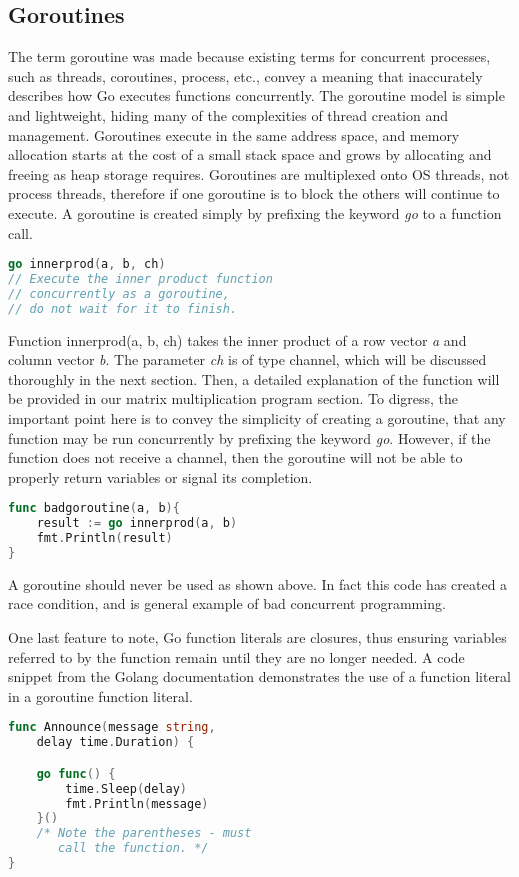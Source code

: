 \subsection{Goroutines}
The term goroutine was made because existing terms for concurrent processes, such as threads, coroutines, process, etc., convey a meaning that inaccurately describes how Go executes functions concurrently. The goroutine model is simple and lightweight, hiding many of the complexities of thread creation and management. Goroutines execute in the same address space, and memory allocation starts at the cost of a small stack space and grows by allocating and freeing as heap storage requires. Goroutines are multiplexed onto OS threads, not process threads, therefore if one goroutine is to block the others will continue to execute.\cite{website:go-lang-documentation}
	A goroutine is created simply by prefixing the keyword \emph{go} to a function call.	
\begin{lstlisting}[language=Go]
go innerprod(a, b, ch) 
// Execute the inner product function
// concurrently as a goroutine,
// do not wait for it to finish.
\end{lstlisting}
Function innerprod(a, b, ch) takes the inner product of a row vector \emph{a} and column vector \emph{b}. The parameter \emph{ch} is of type channel, which will be discussed thoroughly in the next section. Then, a detailed explanation of the function will be provided in our matrix multiplication program section. To digress, the important point here is to convey the simplicity of creating a goroutine, that any function may be run concurrently by prefixing the keyword \emph{go}. However, if the function does not receive a channel, then the goroutine will not be able to properly return variables or signal its completion.
\begin{lstlisting}[language=Go]
func badgoroutine(a, b){
	result := go innerprod(a, b)
	fmt.Println(result)
}
\end{lstlisting}
A goroutine should never be used as shown above. In fact this code has created a race condition, and is general example of bad concurrent programming.

One last feature to note, Go function literals are closures, thus ensuring variables referred to by the function remain until they are no longer needed. A code snippet from the Golang documentation demonstrates the use of a function literal in a goroutine function literal.
\begin{lstlisting}[language=Go]
func Announce(message string, 
	delay time.Duration) {

    go func() {
        time.Sleep(delay)
        fmt.Println(message)
    }()  
    /* Note the parentheses - must
       call the function. */
}
\end{lstlisting}
